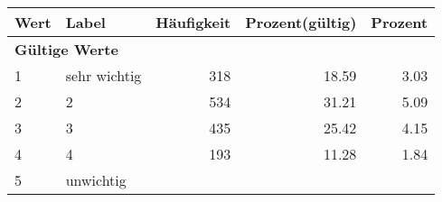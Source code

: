      \begin{longtable}{lXrrr}
     \toprule
     \textbf{Wert} & \textbf{Label} & \textbf{Häufigkeit} & \textbf{Prozent(gültig)} & \textbf{Prozent} \\
     \endhead
     \midrule
     \multicolumn{5}{l}{\textbf{Gültige Werte}}\\

     1 &
     \multicolumn{1}{X}{ sehr wichtig   } &


       \num{318} &
       \num[round-mode=places,round-precision=2]{18.59} &
         \num[round-mode=places,round-precision=2]{3.03} \\

     2 &
     \multicolumn{1}{X}{ 2   } &


       \num{534} &
       \num[round-mode=places,round-precision=2]{31.21} &
         \num[round-mode=places,round-precision=2]{5.09} \\

     3 &
     \multicolumn{1}{X}{ 3   } &


       \num{435} &
       \num[round-mode=places,round-precision=2]{25.42} &
         \num[round-mode=places,round-precision=2]{4.15} \\

     4 &
     \multicolumn{1}{X}{ 4   } &


       \num{193} &
       \num[round-mode=places,round-precision=2]{11.28} &
         \num[round-mode=places,round-precision=2]{1.84} \\

     5 &
     \multicolumn{1}{X}{ unwichtig   } &



\end{longtable}
